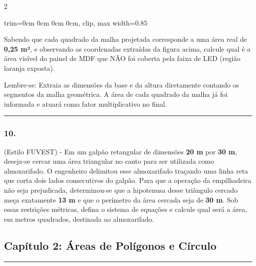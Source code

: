 \documentclass[twoside, 10pt, a4paper]{article}
\newlength{\espacoPosTitulo}\setlength{\espacoPosTitulo}{0.3cm}
\newlength{\espacoPreQuestao}\setlength{\espacoPreQuestao}{0.1cm}
\newlength{\espacoQuestao}\setlength{\espacoQuestao}{0.2cm}
\newcommand{\larguraTikz}{0.85\linewidth}
\begin{document}
\begin{multicols*}{2}
\begin{center}
\begin{adjustbox}{trim=0cm 0cm 0cm 0cm, clip, max width=\larguraTikz}
\end{adjustbox}
\end{center}
Sabendo que cada quadrado da malha projetada corresponde a uma área real de \textbf{0,25 m²}, e observando as coordenadas extraídas da figura acima, calcule qual é a área visível do painel de MDF que NÃO foi coberta pela faixa de LED (região laranja exposta). 
\par\vspace{\espacoQuestao}

\begin{boxdica}
Lembre-se: Extraia as dimensões da base e da altura diretamente contando os segmentos da malha geométrica. A área de cada quadrado da malha já foi informada e atuará como fator multiplicativo no final.
\end{boxdica}

\noindent\textcolor{CorLinha}{\rule{\linewidth}{0.5pt}} 
\par\vspace{\espacoPreQuestao}
\subsubsection*{10.} (Estilo FUVEST) - Em um galpão retangular de dimensões \textbf{20 m} por \textbf{30 m}, deseja-se cercar uma área triangular no canto para ser utilizada como almoxarifado. O engenheiro delimitou esse almoxarifado traçando uma linha reta que corta dois lados consecutivos do galpão. Para que a operação da empilhadeira não seja prejudicada, determinou-se que a hipotenusa desse triângulo cercado meça exatamente \textbf{13 m} e que o perímetro da área cercada seja de \textbf{30 m}. Sob essas restrições métricas, defina o sistema de equações e calcule qual será a área, em metros quadrados, destinada ao almoxarifado.
\par\vspace{\espacoQuestao}
\subsection*{Capítulo 2: Áreas de Polígonos e Círculo}
\vspace{-0.2cm}\noindent\rule{\linewidth}{1.5pt} 
\par\vspace{\espacoPosTitulo}

\end{multicols*}
\end{document}

